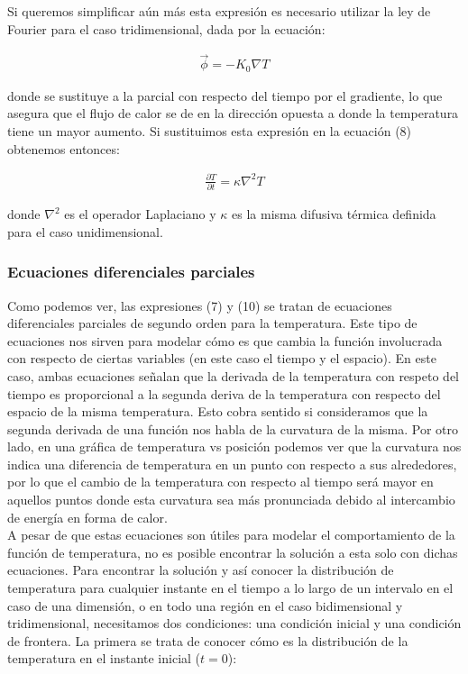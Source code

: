 \documentclass[12pt]{article}
\begin{document}
Si queremos simplificar aún más esta expresión es necesario utilizar la ley de Fourier para el caso tridimensional, dada por la ecuación:

\begin{align}
    \vec{\phi} = -K_0\nabla T
\end{align}

donde se sustituye a la parcial con respecto del tiempo por el gradiente, lo que asegura que el flujo de calor se de en la dirección opuesta a donde la temperatura tiene un mayor aumento. Si sustituimos esta expresión en la ecuación (8) obtenemos entonces:

\begin{align}
    \frac{\partial T}{\partial t} = \kappa \nabla^2 T
\end{align}

donde $\nabla^2$ es el operador Laplaciano y $\kappa$ es la misma difusiva térmica definida para el caso unidimensional.

\subsubsection{Ecuaciones diferenciales parciales}

Como podemos ver, las expresiones (7) y (10) se tratan de ecuaciones diferenciales parciales de segundo orden para la temperatura. Este tipo de ecuaciones nos sirven para modelar cómo es que cambia la función involucrada con respecto de ciertas variables (en este caso el tiempo y el espacio). En este caso, ambas ecuaciones señalan que la derivada de la temperatura con respeto del tiempo es proporcional a la segunda deriva de la temperatura con respecto del espacio de la misma temperatura. Esto cobra sentido si consideramos que la segunda derivada de una función nos habla de la curvatura de la misma. Por otro lado, en una gráfica de temperatura vs posición podemos ver que la curvatura nos indica una diferencia de temperatura en un punto con respecto a sus alrededores, por lo que el cambio de la temperatura con respecto al tiempo será mayor en aquellos puntos donde esta curvatura sea más pronunciada debido al intercambio de energía en forma de calor. \\

A pesar de que estas ecuaciones son útiles para modelar el comportamiento de la función de temperatura, no es posible encontrar la solución a esta solo con dichas ecuaciones. Para encontrar la solución y así conocer la distribución de temperatura para cualquier instante en el tiempo a lo largo de un intervalo en el caso de una dimensión, o en todo una región en el caso bidimensional y tridimensional, necesitamos dos condiciones: una condición inicial y una condición de frontera. La primera se trata de conocer cómo es la distribución de la temperatura en el instante inicial ($t=0$):
\end{document}
